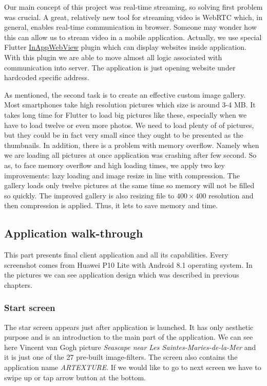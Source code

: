 \documentclass[../Main.tex]{subfiles}
\begin{document}
Our main concept of this project was real-time streaming, so solving first problem was crucial.
A great, relatively new tool for streaming video is WebRTC which, in general, enables real-time communication in browser. 
Someone may wonder how this can allow us to stream video in a mobile application.
Actually, we use special Flutter \href{https://pub.dev/packages/flutter_inappwebview}{InAppWebView} plugin which can display websites inside application.
With this plugin we are able to move almost all logic associated with communication into server.
The application is just opening website under hardcoded specific address.

As mentioned, the second task is to create an effective custom image gallery. 
Most smartphones take high resolution pictures which size is around 3-4 MB.
It takes long time for Flutter to load big pictures like these, especially when
we have to load twelve or even more photos. We need to load plenty of of pictures, but they could be in fact very small since they ought to be presented as the thumbnails.
In addition, there is a problem with 
memory overflow. Namely when we are loading all pictures at once application was
crashing after few second. 
So as, to face memory overflow and high loading times, we apply two key improvements:
lazy loading and image resize in line with compression.
The gallery loads only twelve pictures at the same time so memory will not be filled so quickly.
The improved gallery is also resizing file to $400\times400$ resolution and then compression is applied.
Thus, it lets to save memory and time.

\newpage
\subsection{Application walk-through}
This part presents final client application and all its capabilities.
Every screenshot comes from Huawei P10 Lite with Android 8.1 operating system. In the pictures we can see application design which was described in previous chapters.

\subsubsection{Start screen}
The star screen appears just after application is launched. It has only aesthetic purpose and is an introduction to the main part of the application. We can see here Vincent van Gogh picture \textit{Seascape near Les Saintes-Maries-de-la-Mer} and it is just one of the 27 pre-built image-filters. The screen also contains the application name \textit{ARTEXTURE}. If we would like to go to next screen we have to swipe up or tap arrow button at the bottom.
\end{document}
